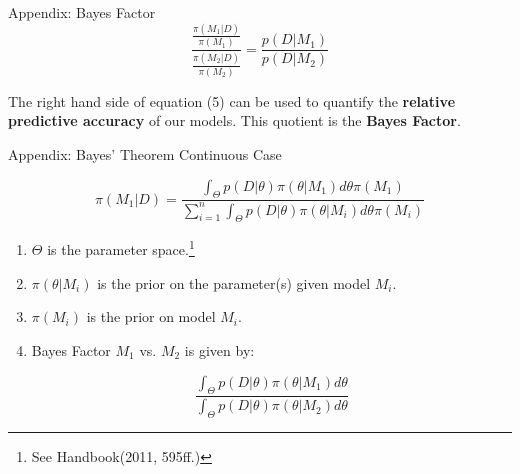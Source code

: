 \documentclass{beamer}
\begin{document}
\begin{frame}{Appendix: Bayes Factor}
\begin{equation}
\frac{\frac{\pi(M_{1} | D)}{\pi(M_{1})}}{\frac{\pi(M_{2} | D)}{\pi(M_{2})}} = \boxed{\frac{p(D | M_{1})}{p(D | M_{2})}}
\end{equation}

The right hand side of equation (5) can be used to quantify the \textbf{relative predictive accuracy} of our models. This quotient is the \textbf{Bayes Factor}.
    \end{frame}
    
\begin{frame}{Appendix: Bayes' Theorem Continuous Case}

\[
\pi(M_{1}| D) = \frac{\int_{\Theta}p(D | \theta)\pi(\theta | M_{1})d\theta \pi(M_{1})}{\sum_{i = 1}^{n}\int_{\Theta}p(D | \theta)\pi(\theta | M_{i})d\theta \pi(M_{i})}
\]
\vfill
\begin{enumerate}
\item $\Theta$ is the parameter space.\footnote{See Handbook(2011, 595ff.)
}
\item $\pi(\theta | M_{i})$ is the prior on the parameter(s) given model $M_{i}$.
\item $\pi(M_{i})$ is the prior on model $M_{i}$.
\item Bayes Factor $M_{1}$ vs. $M_{2}$ is given by:

\[
\frac{\int_{\Theta}p(D | \theta)\pi(\theta | M_{1})d\theta}{\int_{\Theta}p(D | \theta)\pi(\theta | M_{2})d\theta}
\]

\end{enumerate}

\end{frame}
\end{document}
